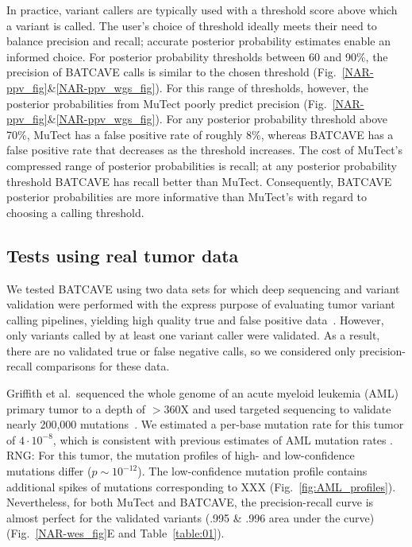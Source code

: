 \documentclass[a4,center,fleqn]{NAR}
\newcommand{\rngcomment}[1]{{\color{red}RNG: #1}}
\newcommand{\batcave}{BATCAVE\xspace}
\begin{document}
In practice, variant callers are typically used with a threshold score above which a variant is called.
The user's choice of threshold ideally meets their need to balance precision and recall; accurate posterior probability estimates enable an informed choice.
For posterior probability thresholds between 60 and 90\%, the precision of \batcave calls is similar to the chosen threshold (Fig.~\ref{NAR-ppv_fig}\&\ref{NAR-ppv_wgs_fig}).
For this range of thresholds, however, the posterior probabilities from MuTect poorly predict precision (Fig.~\ref{NAR-ppv_fig}\&\ref{NAR-ppv_wgs_fig}).
For any posterior probability threshold above 70\%, MuTect has a false positive rate of roughly 8\%, whereas \batcave has a false positive rate that decreases as the threshold increases.
The cost of MuTect's compressed range of posterior probabilities is recall; at any posterior probability threshold \batcave has recall better than MuTect.
Consequently, \batcave posterior probabilities are more informative than MuTect's with regard to choosing a calling threshold.

\subsection{Tests using real tumor data}
We tested \batcave using two data sets for which deep sequencing and variant validation were performed with the express purpose of evaluating tumor variant calling pipelines, yielding high quality true and false positive data~\cite{Griffith2015,Shi2018}.
However, only variants called by at least one variant caller were validated.
As a result, there are no validated true or false negative calls, so we considered only precision-recall comparisons for these data.

Griffith et al.\ sequenced the whole genome of an acute myeloid leukemia (AML) primary tumor to a depth of $>$360X and used targeted sequencing to validate nearly 200,000 mutations~\cite{Griffith2015}.
We estimated a per-base mutation rate for this tumor of $4\cdot10^{-8}$, which is consistent with previous estimates of AML mutation rates \cite{Griffith2015,Williams2018}.
\rngcomment{
For this tumor, the mutation profiles of high- and low-confidence mutations differ ($p \sim 10^{-12}$).
The low-confidence mutation profile contains additional spikes of mutations corresponding to XXX (Fig.~\ref{fig:AML_profiles}).
}
Nevertheless, for both MuTect and \batcave, the precision-recall curve is almost perfect for the validated variants (.995 \& .996 area under the curve) (Fig.~\ref{NAR-wes_fig}E and Table~\ref{table:01}).
\end{document}
